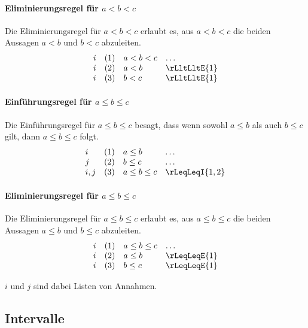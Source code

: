 \documentclass{book}
\theoremstyle{plain}
\theoremstyle{remark}
\theoremstyle{definition}
\begin{document}
\paragraph{Eliminierungsregel für \(a < b < c\)}
Die Eliminierungsregel für \(a < b < c\) erlaubt es, aus \(a < b < c\) die beiden Aussagen \(a < b\) und \(b < c\) abzuleiten.
\[
\begin{array}{llll}
    i & (1) & a < b < c & \dots \\
    i & (2) & a < b & \rLltLltE{1} \\
    i & (3) & b < c & \rLltLltE{1}
\end{array}
\]

\paragraph{Einführungsregel für \(a \leq b \leq c\)}
Die Einführungsregel für \(a \leq b \leq c\) besagt, dass wenn sowohl \(a \leq b\) als auch \(b \leq c\) gilt, dann \(a \leq b \leq c\) folgt.
\[
\begin{array}{llll}
    i   & (1) & a \leq b & \dots \\
    j   & (2) & b \leq c & \dots \\
    i,j & (3) & a \leq b \leq c & \rLeqLeqI{1,2}
\end{array}
\]

\paragraph{Eliminierungsregel für \(a \leq b \leq c\)}
Die Eliminierungsregel für \(a \leq b \leq c\) erlaubt es, aus \(a \leq b \leq c\) die beiden Aussagen \(a \leq b\) und \(b \leq c\) abzuleiten.
\[
\begin{array}{llll}
    i & (1) & a \leq b \leq c & \dots \\
    i & (2) & a \leq b & \rLeqLeqE{1} \\
    i & (3) & b \leq c & \rLeqLeqE{1}
\end{array}
\]

\(i\) und \(j\) sind dabei Listen von Annahmen.

\subsection{Intervalle}
\end{document}
